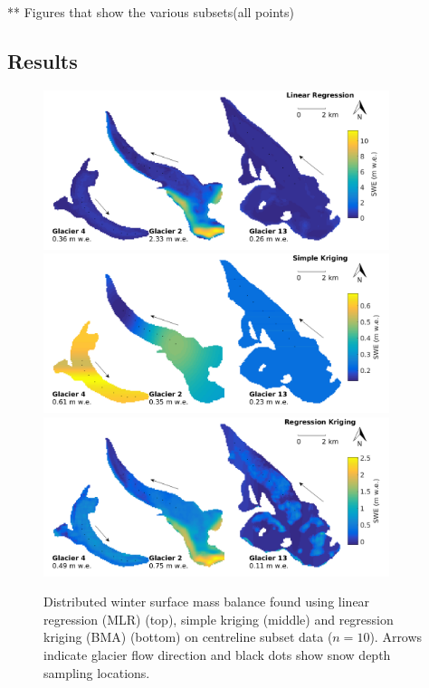 \documentclass[12pt]{article}
\newcommand{\topomap}{Arrows indicate glacier flow direction and black dots show snow depth sampling locations. }
\begin{document}
** Figures that show the various subsets(all points)

\subsection{Results}

\pagebreak
\begin{figure}[H]
	\centering
	\includegraphics[width =0.9\textwidth]{MapSubset_LRcentreline_n10S4.png}\\
	\includegraphics[width =0.9\textwidth]{MapSubset_SKcentreline_n10S4.png}\\
	\includegraphics[width =0.9\textwidth]{MapSubset_RKcentreline_n10S4.png}\\
	\caption{Distributed winter surface mass balance found using  linear regression (MLR) (top), simple kriging (middle) and regression kriging (BMA) (bottom) on centreline subset data ($n=10$).  \topomap}
	\label{fig:MapSubset_centreline_n10S4}
\end{figure}
\end{document}
